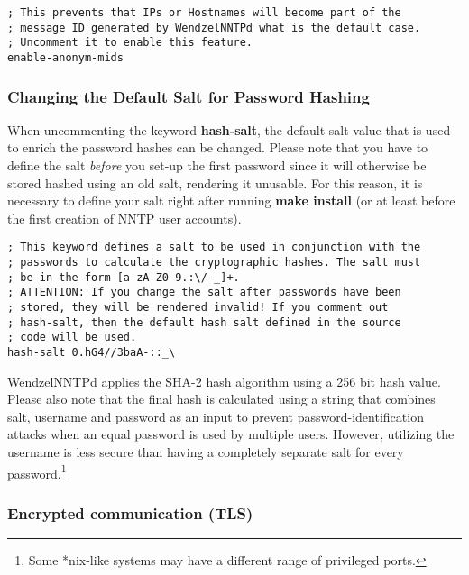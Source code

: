 \documentclass[12pt,fleqn,leqno]{scrbook}
\begin{document}
\begin{verbatim}
; This prevents that IPs or Hostnames will become part of the
; message ID generated by WendzelNNTPd what is the default case.
; Uncomment it to enable this feature.
enable-anonym-mids
\end{verbatim}

\hypertarget{changing-the-default-salt-for-password-hashing}{%
\subsubsection{Changing the Default Salt for Password
Hashing}\label{changing-the-default-salt-for-password-hashing}}

When uncommenting the keyword \textbf{hash-salt}, the default salt value
that is used to enrich the password hashes can be changed. Please note
that you have to define the salt \emph{before} you set-up the first
password since it will otherwise be stored hashed using an old salt,
rendering it unusable. For this reason, it is necessary to define your
salt right after running \textbf{make install} (or at least before the
first creation of NNTP user accounts).

\begin{verbatim}
; This keyword defines a salt to be used in conjunction with the
; passwords to calculate the cryptographic hashes. The salt must
; be in the form [a-zA-Z0-9.:\/-_]+.
; ATTENTION: If you change the salt after passwords have been
; stored, they will be rendered invalid! If you comment out
; hash-salt, then the default hash salt defined in the source
; code will be used.
hash-salt 0.hG4//3baA-::_\
\end{verbatim}

WendzelNNTPd applies the SHA-2 hash algorithm using a 256 bit hash
value. Please also note that the final hash is calculated using a string
that combines salt, username and password as an input to prevent
password-identification attacks when an equal password is used by
multiple users. However, utilizing the username is less secure than
having a completely separate salt for every password.\footnote{Some
  *nix-like systems may have a different range of privileged ports.}

\hypertarget{encrypted-communication-tls}{%
\subsubsection{Encrypted communication
(TLS)}\label{encrypted-communication-tls}}
\end{document}
